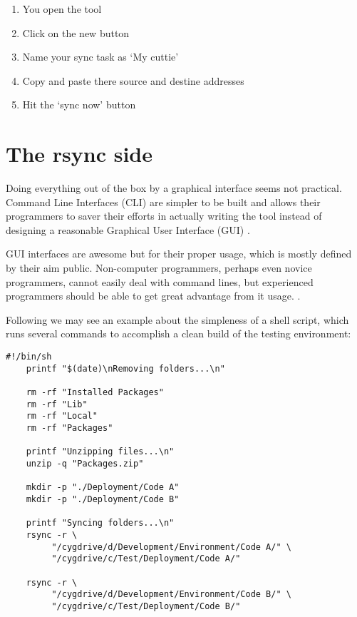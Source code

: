 \begin{englishtext}
    \begin{enumerate}
        \item You open the tool
        \item Click on the new button
        \item Name your sync task as `My cuttie'
        \item Copy and paste there source and destine addresses
        \item Hit the `sync now' button
    \end{enumerate}



    \section{The rsync side}

    Doing everything out of the box by a graphical interface seems not
    practical. Command Line Interfaces (CLI) are simpler to be built and allows
    their programmers to saver their efforts in actually writing the tool
    instead of designing a reasonable Graphical User Interface (GUI)
    \cite{quantificationOfInterface}.

    GUI interfaces are awesome but for their proper usage, which is mostly
    defined by their aim public. Non-computer programmers, perhaps even novice
    programmers, cannot easily deal with command lines, but experienced
    programmers should be able to get great advantage from it usage.
    \cite{commandLineInterface}.

    Following we may see an example about the simpleness of a shell script,
    which runs several commands to accomplish a clean build of the testing
    environment:

    \begin{lstlisting}[caption={rebuild\_workspace.sh}]
    #!/bin/sh
    printf "$(date)\nRemoving folders...\n"

    rm -rf "Installed Packages"
    rm -rf "Lib"
    rm -rf "Local"
    rm -rf "Packages"

    printf "Unzipping files...\n"
    unzip -q "Packages.zip"

    mkdir -p "./Deployment/Code A"
    mkdir -p "./Deployment/Code B"

    printf "Syncing folders...\n"
    rsync -r \
         "/cygdrive/d/Development/Environment/Code A/" \
         "/cygdrive/c/Test/Deployment/Code A/"

    rsync -r \
         "/cygdrive/d/Development/Environment/Code B/" \
         "/cygdrive/c/Test/Deployment/Code B/"
    \end{lstlisting}
    \vspace*{-4mm}


\end{englishtext}
